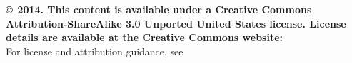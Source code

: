 \chapter*{}
\vfill


\noindent \textbf{$\copyright$ 2014. This content is available under a Creative Commons Attribution-ShareAlike 3.0 Unported United States license. License details are available at the Creative Commons website:  } \\

\noindent For license and attribution guidance, see 

